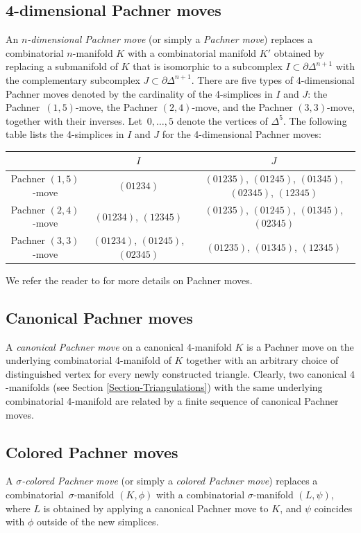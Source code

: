 \documentclass[a4paper, oneside]{amsart}
\numberwithin{equation}{subsection}
\theoremstyle{referencedlemma}
\theoremstyle{plain} %
\theoremstyle{remark}
\begin{document}
\subsection{4-dimensional Pachner moves} An \emph{$n$-dimensional Pachner move} (or simply a \emph{Pachner move}) replaces a combinatorial $n$-manifold $K$ with a combinatorial manifold $K'$ obtained by replacing a submanifold of $K$ that is isomorphic to a subcomplex $I\subset \partial \Delta^{n+1}$ with the complementary subcomplex $J\subset \partial \Delta^{n+1}$.  There are five types of 4-dimensional Pachner moves denoted by the cardinality of the 4-simplices in $I$ and $J$: the Pachner~$(1,5)$-move, the Pachner $(2,4)$-move, and the Pachner $(3,3)$-move, together with their inverses.  Let~$0,\ldots, 5$ denote the vertices of $\Delta^5$. The following table lists the 4-simplices in $I$ and $J$ for the 4-dimensional Pachner moves:
\begin{center}
\begin{tabular}{c | c | c}
& $I$ & $J$ \\
\hline
Pachner $(1,5)$-move & $(01234)$ & $(01235)$, $(01245)$, $(01345)$, $(02345)$, $(12345)$ \\
\hline 
Pachner $(2,4)$-move & $(01234)$, $(12345)$ & $(01235)$, $(01245)$, $(01345)$, $(02345)$\\
\hline
Pachner $(3,3)$-move & $(01234)$, $(01245)$, $(02345)$ & $(01235)$, $(01345)$, $(12345)$
\end{tabular}
\end{center}
We refer the reader to \cite{lickorish_simplicial_1999} for more details on Pachner moves. 

\subsection{Canonical Pachner moves}

A \emph{canonical Pachner move} on a canonical 4-manifold $K$ is a Pachner move on the underlying combinatorial 4-manifold of $K$ together with an arbitrary choice of distinguished vertex for every newly constructed triangle.  Clearly,  two canonical $4$-manifolds (see Section \ref{Section-Triangulations}) with the same underlying combinatorial 4-manifold are related by a finite sequence of canonical Pachner moves. 

\subsection{Colored Pachner moves}
A \emph{$\sigma$-colored Pachner move} (or simply a \emph{colored Pachner move}) replaces a combinatorial~$\sigma$-manifold $(K,\phi)$ with a combinatorial $\sigma$-manifold $(L,\psi)$, where $L$ is obtained by applying a canonical Pachner move to $K$, and $\psi$ coincides with $\phi$ outside of the new simplices. 
\end{document}
